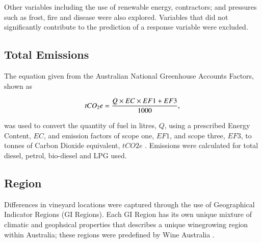\documentclass[review,12pt,authoryear]{elsarticle}
\begin{document}
\begin{linenumbers}
Other variables including the use of renewable energy, contractors; and pressures such as frost, fire and disease were also explored. Variables that did not significantly contribute to the prediction of a response variable were excluded.

\subsection{Total Emissions}
The equation given from the Australian National Greenhouse Accounts Factors, shown as 

\begin{equation}
\label{(1)}
    tCO_{2}e={{Q \times EC \times EF1 + EF3}\over{1000}},
\end{equation}

was used to convert the quantity of fuel in litres, $Q$, using a prescribed Energy Content, $EC$, and emission factors of scope one, $EF1$, and scope three, $EF3$, to tonnes of Carbon Dioxide equivalent, $tCO2e$ \citep{departmentofclimatechangeenergytheenvironmentandwaterAustralianNationalGreenhouse2022}. Emissions were calculated for total diesel, petrol, bio-diesel and LPG used. 


\subsection{Region}
Differences in vineyard locations were captured through the use of Geographical Indicator Regions (GI Regions). Each GI Region has its own unique mixture of climatic and geophsical properties that describes a unique winegrowing region within Australia; these regions were predefined by Wine Australia \citep{hallidayAustralianWineEncyclopedia2009,oliverReviewSoilPhysical2013,soarClimateDriversRed2008}.


\end{linenumbers}
\end{document}

